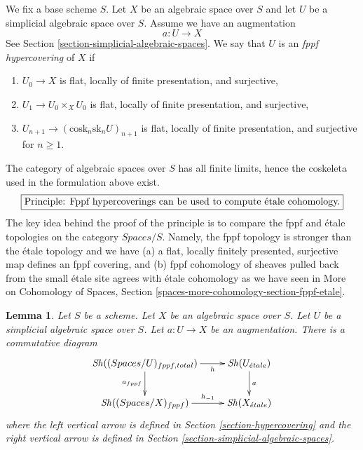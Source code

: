 \documentclass{stacks-project}
\theoremstyle{plain}
\newtheorem{lemma}[subsection]{Lemma}
\theoremstyle{definition}
\theoremstyle{remark}
\numberwithin{equation}{subsection}
\def\Sh{\mathop{\mathit{Sh}}\nolimits}
\def\etale{{\acute{e}tale}}
\begin{document}
\medskip\noindent
We fix a base scheme $S$.
Let $X$ be an algebraic space over $S$ and let $U$ be a simplicial
algebraic space over $S$. Assume we have an augmentation
$$
a : U \to X
$$
See Section \ref{section-simplicial-algebraic-spaces}.
We say that $U$ is an {\it fppf hypercovering} of $X$ if
\begin{enumerate}
\item $U_0 \to X$ is flat, locally of finite presentation, and surjective,
\item $U_1 \to U_0 \times_X U_0$ is flat, locally of finite presentation, and
surjective,
\item $U_{n + 1} \to (\text{cosk}_n\text{sk}_n U)_{n + 1}$
is flat, locally of finite presentation, and surjective for $n \geq 1$.
\end{enumerate}
The category of algebraic spaces over $S$ has all finite limits, hence the
coskeleta used in the formulation above exist.
$$
\fbox{Principle: Fppf hypercoverings can be used to compute \'etale cohomology.}
$$
The key idea behind the proof of the principle is to compare the
fppf and \'etale topologies on the category $\textit{Spaces}/S$.
Namely, the fppf topology is stronger than the \'etale topology and we have
(a) a flat, locally finitely presented, surjective map defines
an fppf covering, and
(b) fppf cohomology of sheaves pulled back from the small \'etale site
agrees with \'etale cohomology as we have seen in
More on Cohomology of Spaces, Section
\ref{spaces-more-cohomology-section-fppf-etale}.

\begin{lemma}
\label{lemma-compare-simplicial-objects-fppf-etale}
Let $S$ be a scheme. Let $X$ be an algebraic space over $S$.
Let $U$ be a simplicial algebraic space over $S$.
Let $a : U \to X$ be an augmentation. There is a commutative diagram
$$
\xymatrix{
\Sh((\textit{Spaces}/U)_{fppf, total}) \ar[r]_-h \ar[d]_{a_{fppf}} &
\Sh(U_\etale) \ar[d]^a \\
\Sh((\textit{Spaces}/X)_{fppf}) \ar[r]^-{h_{-1}} &
\Sh(X_\etale)
}
$$
where the left vertical arrow is defined in
Section \ref{section-hypercovering}
and the right vertical arrow is defined in
Section \ref{section-simplicial-algebraic-spaces}.
\end{lemma}
\end{document}
